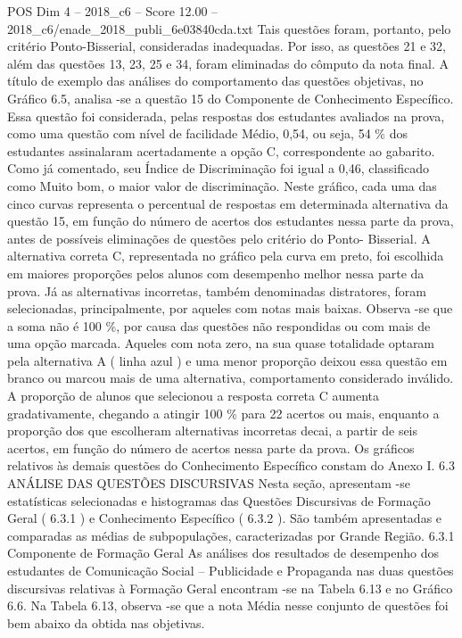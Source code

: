 \begin{textsample}{POS Dim 4 – 2018\_c6 – Score 12.00 – 2018\_c6/enade\_2018\_publi\_6e03840cda.txt}
Tais questões foram, portanto, pelo critério Ponto-Bisserial, consideradas inadequadas.
Por isso, as questões 21 e 32, além das questões 13, 23, 25 e 34, foram eliminadas do cômputo da nota final.
A título de exemplo das análises do comportamento das questões objetivas, no Gráfico 6.5, analisa -se a questão 15 do Componente de Conhecimento Específico.
Essa questão foi considerada, pelas respostas dos estudantes avaliados na prova, como uma questão com nível de facilidade Médio, 0,54, ou seja, 54 \% dos estudantes assinalaram acertadamente a opção C, correspondente ao gabarito.
Como já comentado, seu Índice de Discriminação foi igual a 0,46, classificado como Muito bom, o maior valor de discriminação.
Neste gráfico, cada uma das cinco curvas representa o percentual de respostas em determinada alternativa da questão 15, em função do número de acertos dos estudantes nessa parte da prova, antes de possíveis eliminações de questões pelo critério do Ponto- Bisserial.
A alternativa correta C, representada no gráfico pela curva em preto, foi escolhida em maiores proporções pelos alunos com desempenho melhor nessa parte da prova.
Já as alternativas incorretas, também denominadas distratores, foram selecionadas, principalmente, por aqueles com notas mais baixas.
Observa -se que a soma não é 100 \%, por causa das questões não respondidas ou com mais de uma opção marcada.
Aqueles com nota zero, na sua quase totalidade optaram pela alternativa A ( linha azul ) e uma menor proporção deixou essa questão em branco ou marcou mais de uma alternativa, comportamento considerado inválido.
A proporção de alunos que selecionou a resposta correta C aumenta gradativamente, chegando a atingir 100 \% para 22 acertos ou mais, enquanto a proporção dos que escolheram alternativas incorretas decai, a partir de seis acertos, em função do número de acertos nessa parte da prova.
Os gráficos relativos às demais questões do Conhecimento Específico constam do Anexo I. 6.3 ANÁLISE DAS QUESTÕES DISCURSIVAS Nesta seção, apresentam -se estatísticas selecionadas e histogramas das Questões Discursivas de Formação Geral ( 6.3.1 ) e Conhecimento Específico ( 6.3.2 ).
São também apresentadas e comparadas as médias de subpopulações, caracterizadas por Grande Região. 6.3.1 Componente de Formação Geral As análises dos resultados de desempenho dos estudantes de Comunicação Social – Publicidade e Propaganda nas duas questões discursivas relativas à Formação Geral encontram -se na Tabela 6.13 e no Gráfico 6.6.
Na Tabela 6.13, observa -se que a nota Média nesse conjunto de questões foi bem abaixo da obtida nas objetivas.

\end{textsample}
